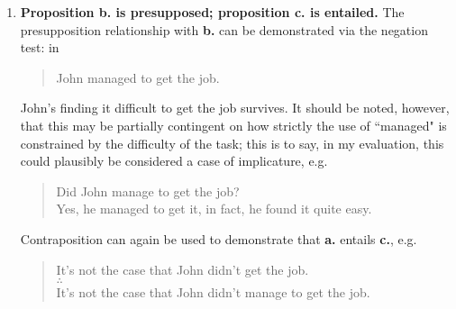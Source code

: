 \documentclass[12pt,a4paper]{article}
\begin{document}
\begin{enumerate}
\item \textbf{Proposition b. is presupposed; proposition c. is entailed.} The presupposition relationship with \textbf{b.} can be demonstrated via the negation test: in
\begin{quote}
John managed to get the job.
\end{quote}
John's finding it difficult to get the job survives. It should be noted, however, that this may be partially contingent on how strictly the use of ``managed" is constrained by the difficulty of the task; this is to say, in my evaluation, this could plausibly be considered a case of implicature, e.g.
\begin{quote}
Did John manage to get the job?\\
Yes, he managed to get it, in fact, he found it quite easy.
\end{quote}
Contraposition can again be used to demonstrate that \textbf{a.} entails \textbf{c.}, e.g.
\begin{quote}
It's not the case that John didn't get the job.\\
$\therefore$\\
It's not the case that John didn't manage to get the job.
\end{quote}

\end{enumerate}
\end{document}
